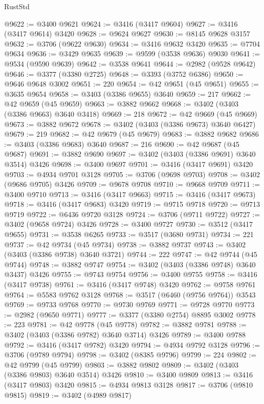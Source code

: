 \begin{lexlean}{RustStd}
\begin{coremodule}
@9622 := @3400 @9621
@9624 := @3416 (@3417 @9604)
@9627 := @3416 (@3417 @9614) @3420
@9628 := @9624 @9627
@9630 := @8145 @9628 @3157
@9632 := @3706 (@9622 @9630)
@9634 := @3416 @9632 @3420
@9635 := @7704 @9634
@9636 := @3429 @9635
@9639 := @9599 (@3538 @9636) @9030
@9641 := @9534 (@9590 @9639)
@9642 := @3538 @9641
@9644 := @2982 (@9528 @9642)
@9646 := @3377 (@3380 @2725)
@9648 := @3393 (@3752 @6386)
@9650 := @9646 @9648 @3002
@9651 := 220
@9654 := @42 @9651 (@45 @9651)
@9655 := @3635 @9654
@9658 := @3403 (@3386 @9655) @3640
@9659 := 217
@9662 := @42 @9659 (@45 @9659)
@9663 := @3882 @9662
@9668 := @3402 (@3403 (@3386 @9663) @3640 @3418)
@9669 := 218
@9672 := @42 @9669 (@45 @9669)
@9673 := @3882 @9672
@9678 := @3402 (@3403 (@3386 @9673) @3640 @6427)
@9679 := 219
@9682 := @42 @9679 (@45 @9679)
@9683 := @3882 @9682
@9686 := @3403 (@3386 @9683) @3640
@9687 := 216
@9690 := @42 @9687 (@45 @9687)
@9691 := @3882 @9690
@9697 := @3402 (@3403 (@3386 @9691) @3640 @3514) @3426
@9698 := @3400 @9697
@9701 := @3416 (@3417 @9691) @3420
@9703 := @4934 @9701 @3128
@9705 := @3706 (@9698 @9703)
@9708 := @3402 (@9686 @9705) @3426
@9709 := @9678 @9708
@9710 := @9668 @9709
@9711 := @3400 @9710
@9713 := @3416 (@3417 @9663)
@9715 := @3416 (@3417 @9673)
@9718 := @3416 (@3417 @9683) @3420
@9719 := @9715 @9718
@9720 := @9713 @9719
@9722 := @6436 @9720 @3128
@9724 := @3706 (@9711 @9722)
@9727 := @3402 (@9658 @9724) @3426
@9728 := @3400 @9727
@9730 := @3512 (@3417 @9655)
@9731 := @3538 @6265
@9733 := @3517 (@3680 @9731)
@9734 := 221
@9737 := @42 @9734 (@45 @9734)
@9738 := @3882 @9737
@9743 := @3402 (@3403 (@3386 @9738) @3640 @3721)
@9744 := 222
@9747 := @42 @9744 (@45 @9744)
@9748 := @3882 @9747
@9754 := @3402 (@3403 (@3386 @9748) @3640 @3437) @3426
@9755 := @9743 @9754
@9756 := @3400 @9755
@9758 := @3416 (@3417 @9738)
@9761 := @3416 (@3417 @9748) @3420
@9762 := @9758 @9761
@9764 := @5583 @9762 @3128
@9768 := @3517 (@6460 (@9756 @9764)) @3543
@9769 := @9733 @9768
@9770 := @9730 @9769
@9771 := @9728 @9770
@9773 := @2982 (@9650 @9771)
@9777 := @3377 (@3380 @2754) @8895 @3002
@9778 := 223
@9781 := @42 @9778 (@45 @9778)
@9782 := @3882 @9781
@9788 := @3402 (@3403 (@3386 @9782) @3640 @3714) @3426
@9789 := @3400 @9788
@9792 := @3416 (@3417 @9782) @3420
@9794 := @4934 @9792 @3128
@9796 := @3706 (@9789 @9794)
@9798 := @3402 (@8385 @9796)
@9799 := 224
@9802 := @42 @9799 (@45 @9799)
@9803 := @3882 @9802
@9809 := @3402 (@3403 (@3386 @9803) @3640 @3514) @3426
@9810 := @3400 @9809
@9813 := @3416 (@3417 @9803) @3420
@9815 := @4934 @9813 @3128
@9817 := @3706 (@9810 @9815)
@9819 := @3402 (@4989 @9817)

\end{coremodule}
\end{lexlean}
